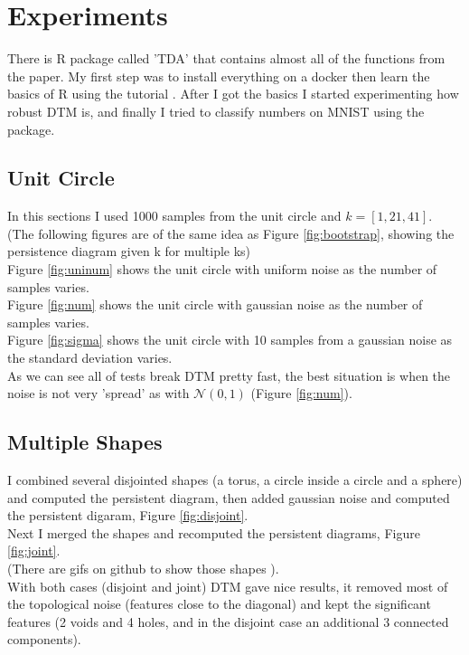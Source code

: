 \documentclass[11pt]{article}
\theoremstyle{definition}
\theoremstyle{definition}
\begin{document}
\newcommand\figu[1]{Figure \ref{#1}}
\section{Experiments}
There is R package called 'TDA' that contains almost all of the functions from the paper.
My first step was to install everything on a docker then learn the basics of R using the tutorial \cite{tut}. After I got the basics I started experimenting how robust DTM is, and finally I tried to classify numbers on MNIST using the package.


\subsection{Unit Circle}


In this sections I used 1000 samples from the unit circle and $k = [1, 21, 41]$.\\
(The following figures are of the same idea as \figu{fig:bootstrap}, showing the persistence diagram given k for multiple ks)\\
\figu{fig:uninum} shows the unit circle with uniform noise as the number of samples varies.\\
\figu{fig:num} shows the unit circle with gaussian noise as the number of samples varies.\\
\figu{fig:sigma} shows the unit circle with 10 samples from a gaussian noise as the standard deviation varies.\\
As we can see all of tests break DTM pretty fast, the best situation is when the noise is not very 'spread' as with $\mathcal{N}(0,1)$ (\figu{fig:num}).


\subsection{Multiple Shapes}


I combined several disjointed shapes (a torus, a circle inside a circle and a sphere) and computed the persistent diagram, then added gaussian noise and computed the persistent digaram, \figu{fig:disjoint}.\\
Next I merged the shapes and recomputed the persistent diagrams, \figu{fig:joint}.\\
(There are gifs on github to show those shapes \cite{git}).\\
With both cases (disjoint and joint) DTM gave nice results, it removed most of the topological noise (features close to the diagonal) and kept the significant features (2 voids and 4 holes, and in the disjoint case an additional 3 connected components).
\end{document}
